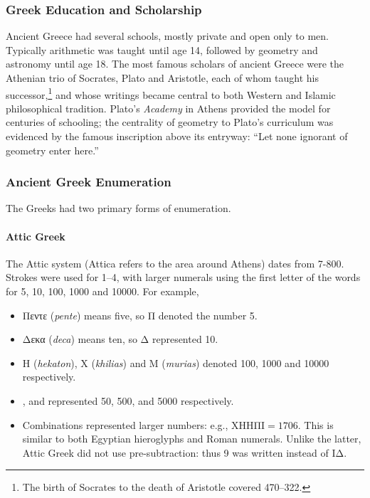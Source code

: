 \subsubsection*{Greek Education and Scholarship}

Ancient Greece had several schools, mostly private and open only to men. %
Typically arithmetic was taught until age 14, followed by geometry and astronomy until age 18.\smallbreak
The most famous scholars of ancient Greece were the Athenian trio of Socrates, Plato and Aristotle, each of whom taught his successor,\footnote{%
	The birth of Socrates to the death of Aristotle covered 470--322\BC.%
}
and whose writings became central to both Western and Islamic philosophical tradition. Plato's \emph{Academy} in Athens provided the model for centuries of schooling; the centrality of geometry to Plato's curriculum was evidenced by the famous inscription above its entryway: ``Let none ignorant of geometry enter here.''


\subsubsection*{Ancient Greek Enumeration}

The Greeks had two primary forms of enumeration.

\paragraph{Attic Greek}

The Attic system (Attica refers to the area around Athens) dates from 7-800\BC. Strokes were used for 1--4, with larger numerals using the first letter of the words for 5, 10, 100, 1000 and 10000. For example,
\begin{itemize}
  \item Πεντε (\emph{pente}) means five, so Π denoted the number 5.
	\item Δεκα (\emph{deca}) means ten, so Δ represented 10.
	\item Η (\emph{hekaton}), Χ (\emph{khilias}) and Μ (\emph{murias}) denoted 100, 1000 and 10000 respectively.
	\item \gkfifty, \gkfivehun{} and \gkfivethou{} represented 50, 500, and 5000 respectively.
	\item Combinations represented larger numbers: e.g., Χ\gkfivehun ΗΗΠΙ$=1706$. This is similar to both Egyptian hieroglyphs and Roman numerals. Unlike the latter, Attic Greek did not use pre-subtraction: thus 9 was written  instead of IΔ.
\end{itemize}

